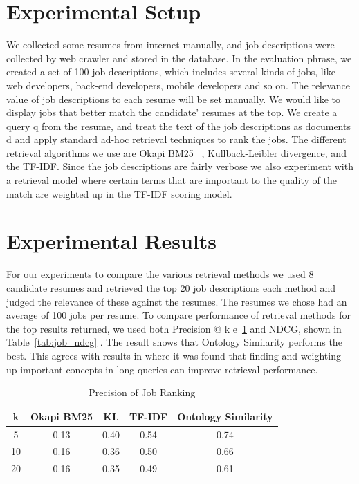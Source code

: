 \section{Experimental Setup}

We collected some resumes from internet manually, and   job descriptions were collected by web crawler and stored in the database. In the evaluation phrase, we created a set of 100 job descriptions, which includes several kinds of jobs, like web developers, back-end developers, mobile developers and so on. The relevance value of job descriptions to each resume will be set manually. We would like to display jobs  that better match the candidate' resumes at the top. We create a query q from the resume, and treat the text of the job descriptions as documents d and apply standard ad-hoc retrieval techniques to rank the jobs.  The different retrieval algorithms we use are Okapi BM25~\cite{robertson2009probabilistic} ,   Kullback-Leibler divergence, and the TF-IDF. Since the job descriptions are fairly verbose we also experiment with a retrieval model where certain terms that are important to the quality of the match are weighted up in the TF-IDF scoring model.

\section{Experimental Results}

For our experiments to compare the various retrieval methods we used 8 candidate resumes  and retrieved the top 20 job descriptions  each method and judged the relevance of these against the resumes. The resumes we chose had an
average of 100 jobs per resume.  To compare performance of retrieval methods for the top results returned, we used
both Precision @ k e~\ref{tab:job_precision} and NDCG, shown in Table~\ref{tab:job_ndcg} . The result  shows that Ontology Similarity  performs the best. This agrees with results in  where it was found that finding and weighting
up important concepts in long queries can improve retrieval performance.

\begin{table}[ht]
\caption{Precision of Job Ranking } %
\centering %
\begin{tabular}{    | c | c | c | c | c |  }
 \hline
       k     & Okapi BM25 & KL    & TF-IDF & Ontology Similarity  \\
 \hline
       5     & 0.13       & 0.40  & 0.54     & 0.74   \\
 \hline
       10    & 0.16       & 0.36  & 0.50     & 0.66   \\
 \hline
       20    & 0.16       & 0.35  & 0.49     & 0.61   \\
 \hline

\end{tabular}
\label{tab:job_precision} %
\end{table}


